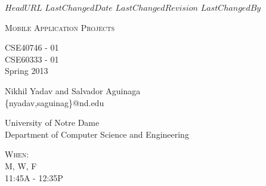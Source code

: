 \svnidlong
{$HeadURL$}
{$LastChangedDate$}
{$LastChangedRevision$}
{$LastChangedBy$}

\thispagestyle{titlepage}

\begin{center}
  \newlength{\parSepLength}
  \setlength{\parSepLength}{10ex}

  \Large
  \centering

  \thinRule\par
  \par\vspace{0.15\parSepLength}
  \begin{minipage}{\textwidth}
    \centering
    \fontsize{40pt}{36pt}\selectfont\titleColor\scshape
    Mobile Application Projects\\
    
  \end{minipage}
  \par\vspace{0.25\parSepLength}
  \par\thinRule

  \vspace{0.125\parSepLength}

  \begin{minipage}{\textwidth}
    \centering
    \large
    CSE40746 - 01 \\
    CSE60333 - 01 \\
    Spring 2013\\
    
  \end{minipage}

  \vfill

  \begin{minipage}{\textwidth}
    \centering
    \Large
    Nikhil Yadav and Salvador Aguinaga\\
    \{nyadav,saguinag\}@nd.edu
  \end{minipage}

  \vfill

  \begin{minipage}{0.8\textwidth}
    \centering
    \small

    \begin{minipage}[t]{0.45\textwidth}
	University of Notre Dame \\
	Department of Computer Science and Engineering\\
	
    \end{minipage}
    \hfill
    \begin{minipage}[t]{0.45\textwidth}
      \raggedleft
      \textsc{When:} \\
      M, W, F\\
      11:45A - 12:35P
    \end{minipage}
  \end{minipage}
\end{center}

